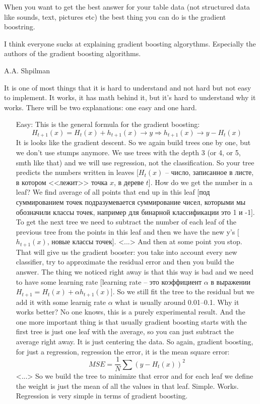 When you want to get the best answer for your table data (not structured data like sounds, text, pictures etc) the best thing you can do is the gradient boostring.
\begin{displayquote}
  {\sf \glqq I think everyone sucks at explaining gradient boosting algorythms. Especially the authors of the gradient boosting algorithms.\grqq
  \begin{flushright}
    A.A. Shpilman
  \end{flushright}}
\end{displayquote}
It is one of most things that it is hard to understand and not hard but not easy to implement. It works, it has math behind it, but it's hard to understand why it works. There will be two explanations: one easy and one hard.
\begin{enumerate}
  \item[Easy:] This is the general formula for the gradient boosting:
  $$H_{t+1}(x)=H_t(x)+h_{t+1}(x)\to y \Rightarrow h_{t+1}(x)\to y - H_t(x)$$
  It is looks like the gradient descent. {\it <A little meeting with the gradient descent>} So we again build trees one by one, but we don't use stumps anymore. We use trees with the depth 3 (or 4, or 5, smth like that) and we will use regression, not the classification. So your tree predicts the numbers written in leaves [$H_t(x)$ -- число, записанное в листе, в котором <<лежит>> точка $x$, в дереве $t$]. How do we get the number in a leaf? We find average of all points that end up in this leaf [под суммированием точек подразумевается суммирование чисел, которыми мы обозначили классы точек, например для бинарной классификации это 1 и -1]. {\it <A slide with an example>} To get the next tree we need to subtract the number of each leaf of the previous tree from the points in this leaf and then we have the new y's [$h_{t+1}(x)$, новые классы точек]. <...> And then at some point you stop. That will give us the gradient booster: you take into account every new classifier, try to approximate the residual error and then you build the answer. The thing we noticed right away is that this way is bad and we need to have some learning rate [learning rate -- это коэффициент $\alpha$ в выражении $H_{t+1}=H_t(x)+\alpha h_{t+1}(x)$]. So we still fit the tree to the residual but we add it with some learnig rate $\alpha$ what is usually around 0.01--0.1. Why it works better? No one knows, this is a purely experimental result. {\it <Some intuition about this experimental result>} And the one more important thing is that usually gradient boosting starts with the first tree is just one leaf with the average, so you can just subtract the average right away. It is just centering the data. So again, gradient boosting, for just a regression, regression the error, it is the mean square error: $$MSE = \frac{1}{N}\sum(y-H_t(x))^2$$ <...> So we build the tree to minimize that error and for each leaf we define the weight is just the mean of all the values in that leaf. Simple. Works. Regression is very simple in terms of gradient boosting.\\

\end{enumerate}
